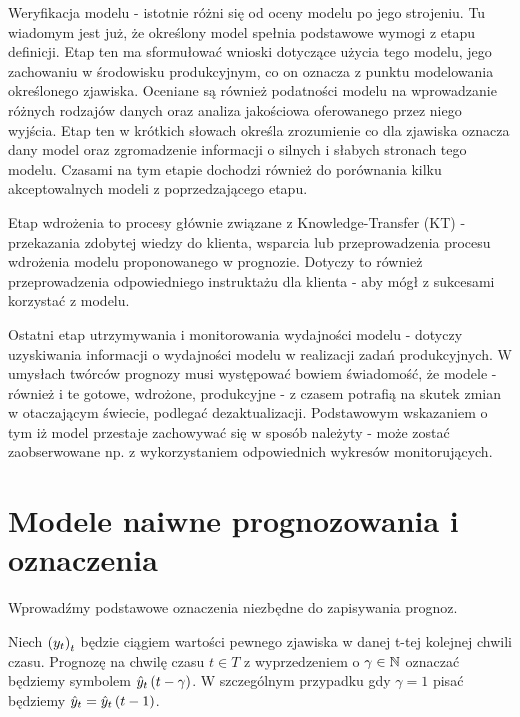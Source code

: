 \documentclass[10pt,a4paper]{book}
\begin{document}
Weryfikacja modelu - istotnie różni się od oceny modelu po jego strojeniu. Tu wiadomym jest już, że określony model spełnia podstawowe wymogi z etapu definicji. Etap ten ma sformułować wnioski dotyczące użycia tego modelu, jego zachowaniu w środowisku produkcyjnym, co on oznacza z punktu modelowania określonego zjawiska. Oceniane są również podatności modelu na wprowadzanie różnych rodzajów danych oraz analiza jakościowa oferowanego przez niego wyjścia. Etap ten w krótkich słowach określa zrozumienie co dla zjawiska oznacza dany model oraz zgromadzenie informacji o silnych i słabych stronach tego modelu. Czasami na tym etapie dochodzi również do porównania kilku akceptowalnych modeli z poprzedzającego etapu.

Etap wdrożenia to procesy głównie związane z Knowledge-Transfer (KT)  - przekazania zdobytej wiedzy do klienta, wsparcia lub przeprowadzenia procesu wdrożenia modelu proponowanego w prognozie. Dotyczy to również przeprowadzenia odpowiedniego instruktażu dla klienta - aby mógł z sukcesami korzystać z modelu.

Ostatni etap utrzymywania i monitorowania wydajności modelu - dotyczy uzyskiwania informacji o wydajności modelu w realizacji zadań produkcyjnych. W umysłach twórców prognozy musi występować bowiem świadomość, że modele  -również i te gotowe, wdrożone, produkcyjne - z czasem potrafią na skutek zmian w otaczającym świecie, podlegać dezaktualizacji. Podstawowym wskazaniem o tym iż model przestaje zachowywać się w sposób należyty - może zostać zaobserwowane np. z wykorzystaniem odpowiednich wykresów monitorujących.

\section{Modele naiwne prognozowania i oznaczenia}

Wprowadźmy podstawowe oznaczenia niezbędne do zapisywania prognoz.

\begin{definition}
Niech $\left( {y_t} \right)_{t}^{} $ będzie ciągiem wartości pewnego zjawiska w danej t-tej kolejnej chwili czasu. Prognozę na chwilę czasu $t \in T$ z wyprzedzeniem o $\gamma \in \mathbb{N}$ oznaczać będziemy symbolem $\predict[t-\gamma]{y}{t}$. W szczególnym przypadku gdy $\gamma =1$ pisać będziemy $\predict{y}{t}= \predict[t-1]{y}{t}$.
\end{definition}
\end{document}
